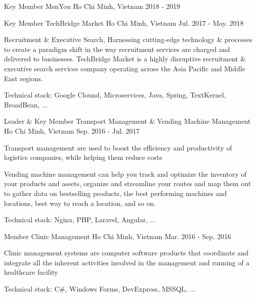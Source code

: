 \begin{cventries}
  \cventry
    {Key Member} %
    {MenYou} %
    {Ho Chi Minh, Vietnam} %
    {2018 - 2019} %
    {}
    
  \cventry
    {Key Member} %
    {TechBridge Market} %
    {Ho Chi Minh, Vietnam} %
    {Jul. 2017 - May. 2018} %
    {
      \begin{cvitems} %
        \item {Recruitment \& Executive Search, Harnessing cutting-edge technology \& processes to create a paradigm shift in the way recruitment services are charged and delivered to businesses. TechBridge Market is a highly disruptive recruitment \& executive search services company operating across the Asia Pacific and Middle East regions.}
        \item {Technical stack: Google Clound, Microservices, Java, Spring, TextKernel, BroadBean, ...}
      \end{cvitems}
    }

  \cventry
    {Leader \& Key Member} %
    {Transport Management \& Vending Machine Management} %
    {Ho Chi Minh, Vietnam} %
    {Sep. 2016 - Jul. 2017} %
    {
      \begin{cvitems} %
        \item {Transport management are used to boost the efficiency and productivity of logistics companies, while helping them reduce costs}
        \item {Vending machine management can help you track and optimize the inventory of your products and assets, organize and streamline your routes and map them out to gather data on bestselling products, the best performing machines and locations, best way to reach a location, and so on.}
        \item {Technical stack: Nginx, PHP, Laravel, Angular, ...}
      \end{cvitems}
    }

  \cventry
    {Member} %
    {Clinic Management} %
    {Ho Chi Minh, Vietnam} %
    {Mar. 2016 - Sep. 2016} %
    {
      \begin{cvitems} %
        \item {Clinic management systems are computer software products that coordinate and integrate all the inherent activities involved in the management and running of a healthcare facility}
        \item {Technical stack: C\#, Windows Forms, DevExpress, MSSQL, ...}
      \end{cvitems}
    }

\end{cventries}
